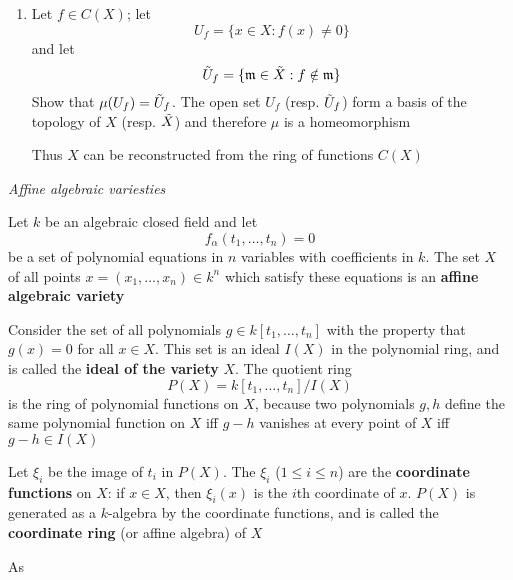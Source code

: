\documentclass[11pt]{article}
\begin{document}
\begin{exercise}
\begin{enumerate}
\item Let \(f\in C(X)\); let
\begin{equation*}
U_f=\{x\in X:f(x)\neq 0\}
\end{equation*}
and let
\begin{equation*}
\tilde{U}_f=\{\mathfrak{m}\in\tilde{X}:f\notin\mathfrak{m}\}
\end{equation*}
Show that \(\mu(U_f)=\tilde{U}_f\). The open set \(U_f\) (resp. \(\tilde{U}_f\)) form a basis of the
topology of \(X\) (resp. \(\tilde{X}\)) and therefore \(\mu\) is a homeomorphism

Thus \(X\) can be reconstructed from the ring of functions \(C(X)\)
\end{enumerate}
\end{exercise}

\emph{Affine algebraic variesties}

\begin{exercise}
\label{ex1.27}
Let \(k\) be an algebraic closed field and let
\begin{equation*}
f_\alpha(t_1,\dots,t_n)=0
\end{equation*}
be a set of polynomial equations in \(n\) variables with coefficients in \(k\). The set \(X\) of
all points \(x=(x_1,\dots,x_n)\in k^n\) which satisfy these equations is an \textbf{affine algebraic variety}

Consider the set of all polynomials \(g\in k[t_1,\dots,t_n]\) with the property that \(g(x)=0\) for
all \(x\in X\). This set is an ideal \(I(X)\) in the polynomial ring, and is called the \textbf{ideal of
the variety} \(X\). The quotient ring
\begin{equation*}
P(X)=k[t_1,\dots,t_n]/I(X)
\end{equation*}
is the ring of polynomial functions on \(X\), because two polynomials \(g,h\) define the same
polynomial function on \(X\) iff \(g-h\) vanishes at every point of \(X\) iff \(g-h\in I(X)\)

Let \(\xi_i\) be the image of \(t_i\) in \(P(X)\). The \(\xi_i\) (\(1\le i\le n\)) are the \textbf{coordinate
functions} on \(X\): if \(x\in X\), then \(\xi_i(x)\) is the \(i\)th coordinate of \(x\). \(P(X)\) is
generated as a \(k\)-algebra by the coordinate functions, and is called the \textbf{coordinate ring} (or
affine algebra) of \(X\)

As
\end{exercise}
\end{document}
